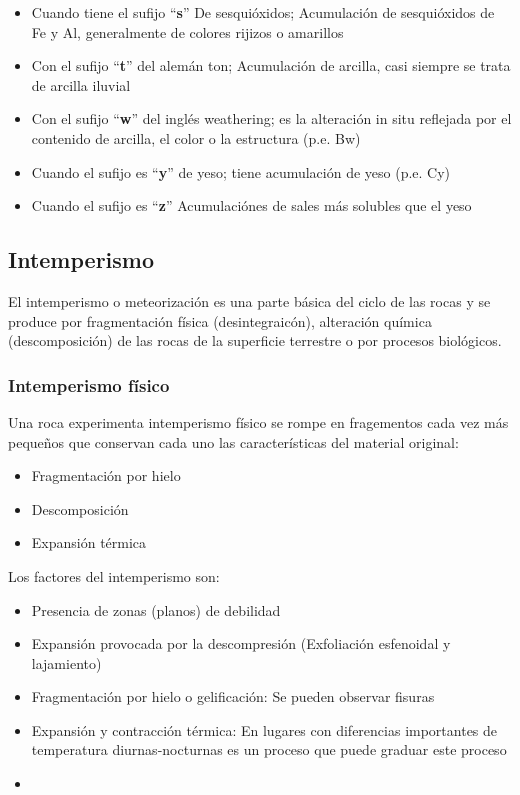 \begin{itemize}
    \item Cuando tiene el sufijo ``\textbf{s}'' De sesquióxidos; Acumulación de sesquióxidos de Fe y Al, generalmente de colores rijizos o amarillos
    \item Con el sufijo ``\textbf{t}'' del alemán ton; Acumulación de arcilla, casi siempre se trata de arcilla iluvial
    \item Con el sufijo ``\textbf{w}'' del inglés weathering; es la alteración in situ reflejada por el contenido de arcilla, el color o la estructura (p.e. Bw)
    \item Cuando el sufijo es ``\textbf{y}'' de yeso; tiene acumulación de yeso (p.e. Cy)
    \item Cuando el sufijo es ``\textbf{z}'' Acumulaciónes de sales más solubles que el yeso
\end{itemize}
\subsection{Intemperismo}
El intemperismo o meteorización es una parte básica del ciclo de las rocas y se produce por fragmentación física (desintegraicón), alteración química (descomposición) de las rocas de la superficie terrestre o por procesos biológicos. 
\subsubsection{Intemperismo físico}
Una roca experimenta intemperismo físico se rompe en fragementos cada vez más pequeños que conservan cada uno las características del material original:
\begin{itemize}
    \item Fragmentación por hielo
    \item Descomposición
    \item Expansión térmica
\end{itemize}
Los factores del intemperismo son:
\begin{itemize}
    \item Presencia de zonas (planos) de debilidad 
    \item Expansión provocada por la descompresión (Exfoliación esfenoidal y lajamiento)
    \item Fragmentación por hielo o gelificación: Se pueden observar fisuras
    \item Expansión y contracción térmica: En lugares con diferencias importantes de temperatura diurnas-nocturnas es un proceso que puede graduar este proceso
    \item 
\end{itemize}
